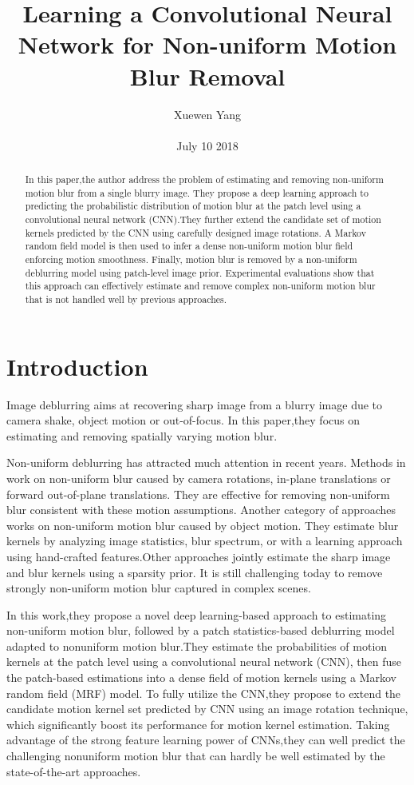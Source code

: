 \documentclass[10pt,twocolumn,letterpaper]{article}
\author{Xuewen Yang\\\\
July 10 2018}
\title{Learning a Convolutional Neural Network for Non-uniform
Motion Blur Removal}
\begin{document}
\maketitle
\begin{abstract}
In this paper,the author address the problem of estimating and
removing non-uniform motion blur from a single blurry image.
They propose a deep learning approach to predicting
the probabilistic distribution of motion blur at the patch
level using a convolutional neural network (CNN).They further
extend the candidate set of motion kernels predicted
by the CNN using carefully designed image rotations. A
Markov random field model is then used to infer a dense
non-uniform motion blur field enforcing motion smoothness.
Finally, motion blur is removed by a non-uniform deblurring
model using patch-level image prior. Experimental
evaluations show that this approach can effectively estimate
and remove complex non-uniform motion blur that is not
handled well by previous approaches.
\end{abstract}
\section{Introduction}
Image deblurring\cite{Cho2007Removing} aims at
recovering sharp image from a blurry image due to camera
shake, object motion or out-of-focus. In this paper,they focus
on estimating and removing spatially varying motion blur.

Non-uniform deblurring has attracted much
attention in recent years. Methods in\cite{Gupta2010Single}\cite{Hirsch2011Fast} work
on non-uniform blur caused by camera rotations, in-plane
translations or forward out-of-plane translations. They are
effective for removing non-uniform blur consistent with
these motion assumptions. Another category of approaches
works on non-uniform motion blur caused by object motion.
They estimate blur kernels by analyzing image statistics, blur spectrum, or with a learning approach using
hand-crafted features\cite{Couzini2013Learning}.Other approaches
jointly estimate the sharp image and blur kernels using
a sparsity prior. It is still challenging today to remove
strongly non-uniform motion blur captured in complex
scenes.

In this work,they propose a novel deep learning-based approach
to estimating non-uniform motion blur, followed by a patch statistics-based deblurring model adapted to nonuniform
motion blur.They estimate the probabilities of motion
kernels at the patch level using a convolutional neural
network (CNN), then fuse the patch-based
estimations into a dense field of motion kernels using a
Markov random field (MRF) model. To fully utilize the
CNN,they propose to extend the candidate motion kernel
set predicted by CNN using an image rotation technique,
which significantly boost its performance for motion kernel
estimation. Taking advantage of the strong feature learning
power of CNNs,they can well predict the challenging nonuniform
motion blur that can hardly be well estimated by
the state-of-the-art approaches.
\end{document}
